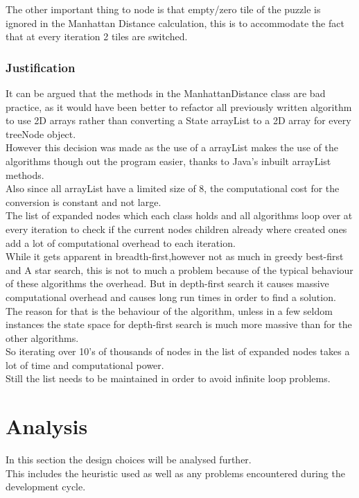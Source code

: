 \documentclass[journal]{IEEEtran}
\begin{document}
The other important thing to node is that empty/zero tile of the puzzle is ignored in the Manhattan Distance calculation, this is to accommodate the fact that at every iteration 2 tiles are switched.\\

\subsubsection{Justification}
It can be argued that the methods in the ManhattanDistance class are bad practice, as it would have been better to refactor all previously written algorithm to use 2D arrays rather than converting a State arrayList to a 2D array for every treeNode object. \\
However this decision was made as the use of a arrayList makes the use of the algorithms though out the program easier, thanks to Java's inbuilt arrayList methods. \\
Also since all arrayList have a limited size of 8, the computational cost for the conversion is constant and not large. \\

The list of expanded nodes which each class holds and all algorithms loop over at every iteration to check if the current nodes children already where created ones add a lot of computational overhead to each iteration. \\
While it gets apparent in breadth-first,however not as much in greedy best-first and A star search, this is not to much a problem because of the typical behaviour of these algorithms the overhead. But in depth-first search it causes massive computational overhead and causes long run times in order to find a solution. \\
The reason for that is the behaviour of the algorithm, unless in a few seldom instances the state space for depth-first search is much more massive than for the other algorithms. \\
So iterating over 10's of thousands of nodes in the list of expanded nodes takes a lot of time and computational power. \\
Still the list needs to be maintained in order to avoid infinite loop problems.


\section{Analysis}\label{sec:analysis}
In this section the design choices will be analysed further. \\
This includes the heuristic used as well as any problems encountered during the development cycle. \\
\end{document}
